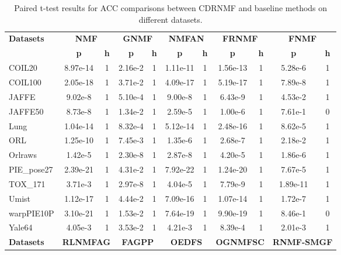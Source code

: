 \documentclass[a4paper,fleqn]{cas-sc}
\begin{document}
\begin{table}[h!]
	\centering
	\caption{Paired t-test results for ACC comparisons between CDRNMF and baseline methods on different datasets.}
	{\footnotesize
	\begin{tabular}{lcccccccccc}
		\toprule
		\textbf{Datasets} & \multicolumn{2}{c}{\textbf{NMF}} & \multicolumn{2}{c}{\textbf{GNMF}} & \multicolumn{2}{c}{\textbf{NMFAN}} & \multicolumn{2}{c}{\textbf{FRNMF}} & \multicolumn{2}{c}{\textbf{FNMF}} \\
		\cmidrule(r){2-3} \cmidrule(r){4-5} \cmidrule(r){6-7} \cmidrule(r){8-9} \cmidrule(r){10-11}
		& \textbf{p} & \textbf{h} & \textbf{p} & \textbf{h} & \textbf{p} & \textbf{h} & \textbf{p} & \textbf{h} & \textbf{p} & \textbf{h} \\
		\midrule
		COIL20 & 8.97e-14 & 1 & 2.16e-2 & 1 & 1.11e-11 & 1 & 1.56e-13 & 1 & 5.28e-6 & 1 \\
		COIL100 & 2.05e-18 & 1 & 3.71e-2 & 1 & 4.09e-17 & 1 & 5.19e-17 & 1 & 7.89e-8 & 1 \\
		JAFFE & 9.02e-8 & 1 & 5.10e-4 & 1 & 9.00e-8 & 1 & 6.43e-9 & 1 & 4.53e-2 & 1 \\
		JAFFE50 & 8.73e-8 & 1 & 1.34e-2 & 1 & 2.59e-5 & 1 & 1.00e-6 & 1 & 7.61e-1 & 0 \\
		Lung & 1.04e-14 & 1 & 8.32e-4 & 1 & 5.12e-14 & 1 & 2.48e-16 & 1 & 8.62e-5 & 1 \\
		ORL & 1.25e-10 & 1 & 7.45e-3 & 1 & 1.35e-6 & 1 & 2.68e-7 & 1 & 2.18e-2 & 1 \\
		Orlraws & 1.42e-5 & 1 & 2.30e-8 & 1 & 2.87e-8 & 1 & 4.20e-5 & 1 & 1.86e-6 & 1 \\
		PIE\_pose27 & 2.39e-21 & 1 & 4.31e-2 & 1 & 7.92e-22 & 1 & 1.24e-20 & 1 & 7.67e-5 & 1 \\
		TOX\_171 & 3.71e-3 & 1 & 2.97e-8 & 1 & 4.04e-5 & 1 & 7.79e-9 & 1 & 1.89e-11 & 1 \\
		Umist & 1.12e-17 & 1 & 4.44e-2 & 1 & 7.09e-16 & 1 & 1.07e-14 & 1 & 1.72e-7 & 1 \\
		warpPIE10P & 3.10e-21 & 1 & 1.53e-2 & 1 & 7.64e-19 & 1 & 9.90e-19 & 1 & 8.46e-1 & 0 \\
		Yale64 & 4.05e-3 & 1 & 3.53e-2 & 1 & 4.21e-3 & 1 & 8.39e-4 & 1 & 2.01e-3 & 1 \\
		\midrule
		\textbf{Datasets} & \multicolumn{2}{c}{\textbf{RLNMFAG}} & \multicolumn{2}{c}{\textbf{FAGPP}} & \multicolumn{2}{c}{\textbf{OEDFS}} & \multicolumn{2}{c}{\textbf{OGNMFSC}} & \multicolumn{2}{c}{\textbf{RNMF-SMGF}} \\
		\cmidrule(r){2-3} \cmidrule(r){4-5} \cmidrule(r){6-7} \cmidrule(r){8-9} \cmidrule(r){10-11}

\end{tabular}}
\end{table}
\end{document}
